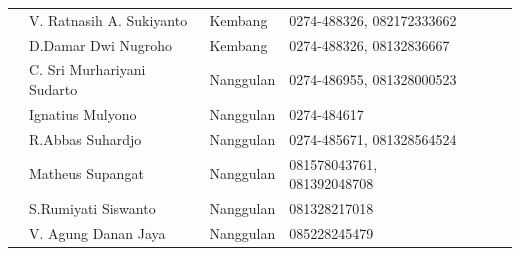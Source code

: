 \documentclass{article}
\begin{document}
\begin{flushleft}
\begin{supertabular}{|m{0.79800004cm}|m{3.5609999cm}|m{2.179cm}|m{2.658cm}|m{0.753cm}|m{-0.04100001cm}|m{0.689cm}|m{-0.04100001cm}|m{0.753cm}|}
 &
V. Ratnasih A. Sukiyanto &
Kembang &
0274-488326, 082172333662 &
 &
 &
\\
 &
D.Damar Dwi Nugroho &
Kembang &
0274-488326, 08132836667 &
 &
 &
\\
 &
C. Sri Murhariyani Sudarto &
Nanggulan &
0274-486955, 081328000523 &
 &
 &
\\
 &
Ignatius Mulyono &
Nanggulan &
0274-484617 &
 &
 &
\\
 &
R.Abbas Suhardjo &
Nanggulan &
0274-485671, 081328564524 &
 &
 &
\\
 &
Matheus Supangat &
Nanggulan &
081578043761, 081392048708 &
 &
 &
\\
 &
S.Rumiyati Siswanto &
Nanggulan &
081328217018 &
 &
 &
\\
 &
V. Agung Danan Jaya &
Nanggulan &
085228245479 &
 &
 &
\\

\end{supertabular}
\end{flushleft}
\end{document}
